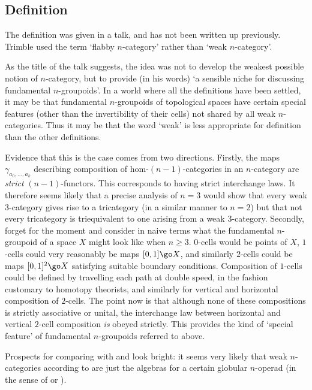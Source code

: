 \subsection*{Definition }

The definition was given in a talk,
% 
%
% 
and has not been written up previously.  Trimble used the term `flabby
$n$-category' rather than `weak $n$-category'.  

As the title of the talk suggests, the idea was not to develop the weakest
possible notion of $n$-category, but to provide (in his words) `a sensible
niche for discussing fundamental $n$-groupoids'.  In a world where all the
definitions have been settled, it may be that fundamental $n$-groupoids of
topological spaces have certain special features (other than the
invertibility of their cells) not shared by all weak $n$-categories.  Thus it
may be that the word `weak' is less appropriate for definition  than
the other definitions.

Evidence that this is the case comes from two directions.  Firstly, the maps
$\gamma_{a_0, \ldots, a_k}$ describing composition of hom-$(n-1)$-categories
in an $n$-category are \emph{strict} $(n-1)$-functors.  This corresponds to
having strict interchange laws.  It therefore seems likely that a precise
analysis of $n=3$ would show that every weak $3$-category gives rise to a
tricategory (in a similar manner to $n=2$) but that not every tricategory is
triequivalent to one arising from a weak $3$-category.  Secondly, forget
 for the moment and consider in naive terms what the fundamental
$n$-groupoid of a space $X$ might look like when $n\geq 3$.  $0$-cells would
be points of $X$, $1$-cells could very reasonably be maps $[0,1] \go X$, and
similarly $2$-cells could be maps $[0,1]^2 \go X$ satisfying suitable
boundary conditions.  Composition of $1$-cells could be defined by travelling
each path at double speed, in the fashion customary to homotopy theorists,
and similarly for vertical and horizontal composition of $2$-cells.  The
point now is that although none of these compositions is strictly associative
or unital, the interchange law between horizontal and vertical $2$-cell
composition \emph{is} obeyed strictly.  This provides the kind of `special
feature' of fundamental $n$-groupoids referred to above.

Prospects for comparing  with  and  look bright: it seems
very likely that weak $n$-categories according to  are just the
algebras for a certain globular $n$-operad (in the sense of  or
).


